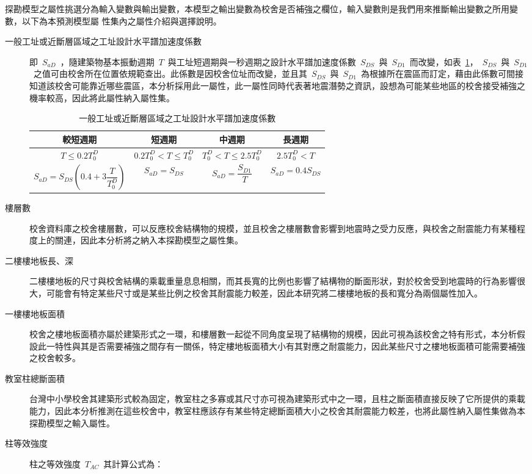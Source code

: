 探勘模型之屬性挑選分為輸入變數與輸出變數，本模型之輸出變數為校舍是否補強之欄位，輸入變數則是我們用來推斷輸出變數之所用變數，以下為本預測模型屬 性集內之屬性介紹與選擇說明。

\begin{description}
  \item [一般工址或近斷層區域之工址設計水平譜加速度係數]
  \cite{內政部營建署編輯委員會2005建築物耐震設計規範及解說} 即~$S_{aD}$~，隨建築物基本振動週期~$T$~與工址短週期與一秒週期之設計水平譜加速度係數~$S_{DS}$~與~$S_{D1}$~而改變，如表~\ref{tab:sad}，~$S_{DS}$~與~$S_{D1}$~之值可由校舍所在位置依規範查出。此係數是因校舍位址而改變，並且其~$S_{DS}$~與~$S_{D1}$~為根據所在震區而訂定，藉由此係數可間接知道該校舍可能靠近哪些震區，本分析採用此一屬性，此一屬性同時代表著地震潛勢之資訊，設想為可能某些地區的校舍接受補強之機率較高，因此將此屬性納入屬性集。

{\renewcommand{\arraystretch}{1.5}
\begin{table}[hbtp]
  \begin{center}
    \caption{一般工址或近斷層區域之工址設計水平譜加速度係數}
    \label{tab:sad}
    \begin{tabular}{c c c c}
      \hline
       較短週期 & 短週期 & 中週期 & 長週期 \\
      \hline
       $T \leq 0.2 T^D_0$ &  $0.2 T^D_0 < T \leq T^D_0$ & $T^D_0 < T \leq 2.5 T^D_0$  & $2.5 T^D_0 < T$  \\
       $ S_{aD} = S_{DS}(0.4 + 3 \dfrac{T}{T^D_0}) $ & $ S_{aD} = S_{DS} $ & $ S_{aD} = \dfrac{S_{D1}}{T} $ & $ S_{aD} = 0.4 S_{DS} $ \\
      \hline
      \end{tabular}
  \end{center}
\end{table}
}


  \item [樓層數]
  校舍資料庫之校舍樓層數，可以反應校舍結構物的規模，並且校舍之樓層數會影響到地震時之受力反應，與校舍之耐震能力有某種程度上的關連，因此本分析將之納入本探勘模型之屬性集。
  \item [二樓樓地板長、深]
  二樓樓地板的尺寸與校舍結構的乘載重量息息相關，而其長寬的比例也影響了結構物的斷面形狀，對於校舍受到地震時的行為影響很大，可能會有特定某些尺寸或是某些比例之校舍其耐震能力較差，因此本研究將二樓樓地板的長和寬分為兩個屬性加入。
  \item [一樓樓地板面積]
  校舍之樓地板面積亦屬於建築形式之一環，和樓層數一起從不同角度呈現了結構物的規模，因此可視為該校舍之特有形式，本分析假設此一特性與其是否需要補強之間存有一關係，特定樓地板面積大小有其對應之耐震能力，因此某些尺寸之樓地板面積可能需要補強之校舍較多。
  \item [教室柱總斷面積]
  台灣中小學校舍其建築形式較為固定，教室柱之多寡或其尺寸亦可視為建築形式中之一環，且柱之斷面積直接反映了它所提供的乘載能力，因此本分析推測在這些校舍中，教室柱應該存有某些特定總斷面積大小之校舍其耐震能力較差，也將此屬性納入屬性集做為本探勘模型之輸入屬性。
  \item [柱等效強度]
  柱之等效強度~$T_{AC}$~其計算公式為：


\end{description}
